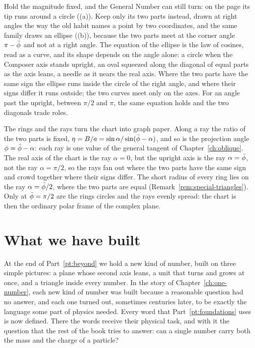 \begin{plainwords}
Hold the magnitude fixed, and the General Number can still turn: on the page its tip runs around a circle ((a)). Keep only its two parts instead, drawn at right angles the way the old habit names a point by two coordinates, and the same family draws an ellipse ((b)), because the two parts meet at the corner angle $\pi - \bar{\phi}$ and not at a right angle. The equation of the ellipse is the law of cosines, read as a curve, and its shape depends on the angle alone: a circle when the Composer axis stands upright, an oval squeezed along the diagonal of equal parts as the axis leans, a needle as it nears the real axis. Where the two parts have the same sign the ellipse runs inside the circle of the right angle, and where their signs differ it runs outside; the two curves meet only on the axes. For an angle past the upright, between $\pi/2$ and $\pi$, the same equation holds and the two diagonals trade roles.

The rings and the rays turn the chart into graph paper. Along a ray the ratio of the two parts is fixed, $\eta = B/a = \sin\alpha/\sin(\bar{\phi} - \alpha)$, and so is the projection angle $\phi = \bar{\phi} - \alpha$: each ray is one value of the general tangent of Chapter~\ref{ch:oblique}. The real axis of the chart is the ray $\alpha = 0$, but the upright axis is the ray $\alpha = \bar{\phi}$, not the ray $\alpha = \pi/2$, so the rays fan out where the two parts have the same sign and crowd together where their signs differ. The short radius of every ring lies on the ray $\alpha = \bar{\phi}/2$, where the two parts are equal (Remark~\ref{rem:special-triangles}). Only at $\bar{\phi} = \pi/2$ are the rings circles and the rays evenly spread: the chart is then the ordinary polar frame of the complex plane.
\end{plainwords}



\section*{What we have built}\label{sec:gn-summary}

At the end of Part~\ref{pt:beyond} we hold a new kind of number, built on three simple pictures: a plane whose second axis leans, a unit that turns and grows at once, and a triangle inside every number. In the story of Chapter~\ref{ch:one-number}, each new kind of number was built because a reasonable question had no answer, and each one turned out, sometimes centuries later, to be exactly the language some part of physics needed. Every word that Part~\ref{pt:foundations} uses is now defined. There the words receive their physical task, and with it the question that the rest of the book tries to answer: can a single number carry both the mass and the charge of a particle?

